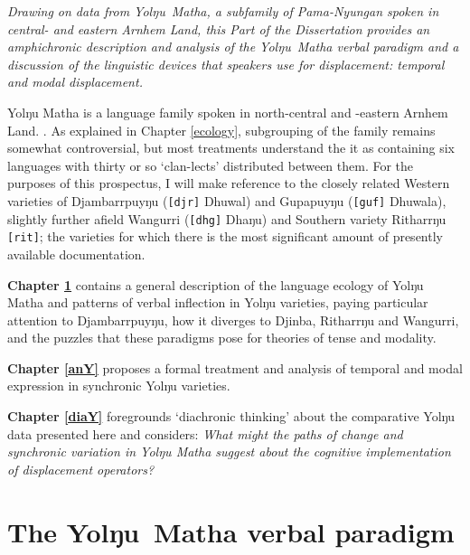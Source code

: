 \documentclass[11pt]{report}
\date{}
\newcommand{\mcom}[1]
{\marginpar{\color{black}\raggedleft\raggedright\hspace{0pt}\linespread{0.9}\footnotesize{#1}}}
\begin{document}
	


\vspace*{\fill}
\sl Drawing on data from Yolŋu~Matha, a subfamily of Pama-Nyungan spoken in central- and eastern Arnhem Land, this Part of the Dissertation provides an amphichronic description and analysis of the Yolŋu~Matha verbal paradigm and a discussion of the linguistic devices that speakers use for displacement: temporal and modal displacement.

Yolŋu Matha is a language family spoken in north-central and -eastern Arnhem Land. \mcom{Xref here to introductory chapter/s}. As explained in Chapter \ref{ecology}, subgrouping of the family remains somewhat controversial, but most treatments understand the it as containing six languages with thirty or so `clan-lects' distributed between them. For the purposes of this prospectus, I will make reference to the closely related Western varieties of Djambarrpuyŋu (\texttt{[djr]} Dhuwal) and Gupapuyŋu (\texttt{[guf]} Dhuwala), slightly further afield Wangurri (\texttt{[dhg]} Dhaŋu) and Southern variety Ritharrŋu \texttt{[rit]}; the varieties for which there is the most significant amount of presently available documentation.

\textbf{Chapter \ref{descY}} contains a general description of the language ecology of Yolŋu Matha and patterns of verbal inflection in Yolŋu varieties, paying particular attention to Djambarrpuyŋu, how it diverges to Djinba, Ritharrŋu and Wangurri, and the puzzles that these paradigms pose for theories of tense and modality.

\textbf{Chapter \ref{anY}} proposes a formal treatment and analysis of temporal and modal expression in synchronic Yolŋu varieties.

\textbf{Chapter \ref{diaY} }foregrounds `diachronic thinking' about the comparative Yolŋu data presented here and considers: {\em What might the paths of change and synchronic variation in Yolŋu Matha suggest about the cognitive implementation of displacement operators?}
\vfill

\upshape 

\chapter{The Yolŋu~Matha verbal paradigm}\label{descY}
\end{document}
